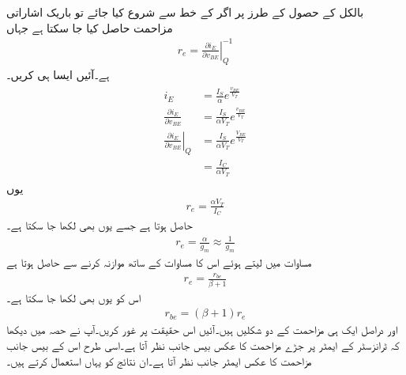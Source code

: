 بالکل  کے حصول کے طرز پر اگر  کے خط سے شروع کیا جائے تو باریک اشاراتی مزاحمت  حاصل کیا جا سکتا ہے جہاں
\begin{align}
r_e = \left . \frac{\partial i_E}{\partial v_{BE}} \right |_Q^{-1}
\end{align}
ہے۔آئیں ایسا ہی کریں۔
\begin{gather}
\begin{aligned}
i_E&=\frac{I_S}{\alpha} e^{\frac{v_{BE}}{V_T}}\\
\frac{\partial i_E}{\partial v_{BE}}&=\frac{I_S}{\alpha V_T}e^{\frac{v_{BE}}{V_T}}\\
\left . \frac{\partial i_E}{\partial v_{BE}}\right |_Q &=\frac{I_S}{\alpha V_T} e^{\frac{V_{BE}}{V_T}}\\
&=\frac{I_C}{\alpha V_T}
\end{aligned}
\end{gather}
یوں
\begin{align} \label{مساوات_ٹرانزسٹر_مخارج_مزاحمت_بالمقابل_رو}
r_e = \frac{\alpha V_T}{I_C}
\end{align}
حاصل ہوتا ہے جسے یوں بھی لکھا جا سکتا ہے۔
\begin{align}\label{مساوات_ٹرانزسٹر_اندرونی_مخارج_مزاحمت_کی_مساوات}
r_e = \frac{\alpha}{g_m} \approx \frac{1}{g_m}
\end{align}
مساوات   میں  لیتے ہوئے اس کا مساوات   کے ساتھ موازنہ کرنے سے حاصل ہوتا ہے
\begin{align} \label{مساوات_ٹرانزسٹر_داخلی_باریک_مزاحمت_کا_عکس}
r_e = \frac{r_{be}}{\beta+1}
\end{align}
اس کو یوں بھی لکھا جا سکتا ہے۔
\begin{align} \label{مساوات_ٹرانزسٹر_خارجی_باریک_مزاحمت_کا_عکس}
r_{be}=\left (\beta+1 \right ) r_e
\end{align}
 اور  دراصل ایک ہی مزاحمت کے دو شکلیں ہیں۔آئیں اس حقیقت پر غور کریں۔آپ نے حصہ میں دیکھا کہ ٹرانزسٹر کے ایمٹر پر جڑے مزاحمت   کا عکس بیس جانب   نظر آتا ہے۔اسی طرح اس کے بیس جانب مزاحمت  کا عکس ایمٹر جانب  نظر آتا ہے۔ان نتائج کو یہاں استعمال کرتے ہیں۔

